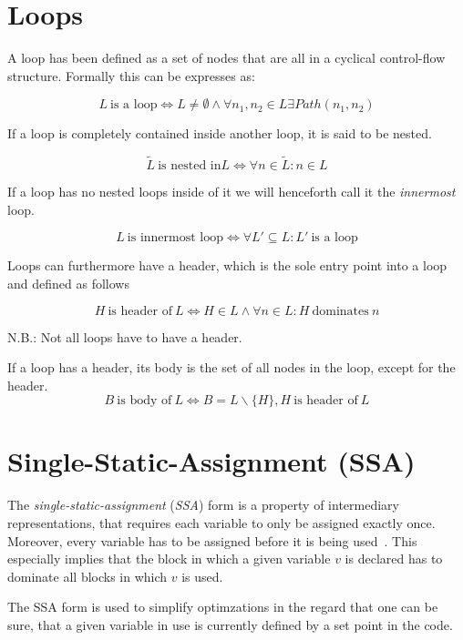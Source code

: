 
\section{Loops}\label{sec:basics:loops}

A loop has been defined as a set of nodes that are all in a cyclical control-flow structure.
Formally this can be expresses as:

$$L~\text{is a loop} \Longleftrightarrow L \neq \emptyset \wedge \forall n_1, n_2 \in L \exists Path(n_1, n_2)$$

If a loop is completely contained inside another loop, it is said to be nested.

$$\tilde{L}~\text{is nested in} L \Longleftrightarrow \forall n \in \tilde{L}: n \in L$$

If a loop has no nested loops inside of it we will henceforth call it the \textit{innermost} loop.

$$L~\text{is innermost loop} \Longleftrightarrow \forall L' \subseteq L: L'~\text{is a loop}$$

Loops can furthermore have a header, which is the sole entry point into a loop~\cite{aebi18bachelorarbeit} and defined as follows

$$H~\text{is header of}~L \Longleftrightarrow H \in L \wedge \forall n \in L: H~\text{dominates}~n$$

N.B.: Not all loops have to have a header.

If a loop has a header, its body is the set of all nodes in the loop, except for the header.
$$B~\text{is body of}~L \Longleftrightarrow B = L \backslash \{H\}, H~\text{is header of}~L$$

\section{Single-Static-Assignment (SSA)}\label{sec:basics:ssa}

The \textit{single-static-assignment} (\textit{SSA}) form is a property of intermediary representations, that requires each variable to only be assigned exactly once.
Moreover, every variable has to be assigned before it is being used~\cite{cytron91}.
This especially implies that the block in which a given variable $v$ is declared has to dominate all blocks in which $v$ is used.

The SSA form is used to simplify optimzations in the regard that one can be sure, that a given variable in use is currently defined by a set point in the code.

